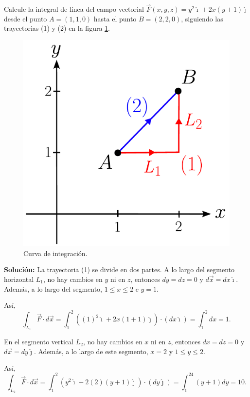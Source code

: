 \begin{ejemplo}
    Calcule la integral de línea del campo vectorial $\Vec{F}(x,y,z) = y^2 \hat{\imath} + 2x(y+1) \hat{\jmath}$ desde el punto $A = (1,1,0)$ hasta el punto $B = (2,2,0)$, siguiendo las trayectorias (1) y (2) en la figura \ref{fig:Ej_Int_Linea}.

    \begin{figure}[H]
        \centering
        \includegraphics[scale = 0.55]{Figuras/Ej-Integral-Linea.pdf}
        \caption{Curva de integración.}
        \label{fig:Ej_Int_Linea}
    \end{figure}

    \textbf{Solución:} La trayectoria (1) se divide en dos partes. A lo largo del segmento horizontal $L_1$, no hay cambios en $y$ ni en $z$, entonces $dy = dz = 0$ y $d\Vec{x} = dx \hat{\imath}$. Además, a lo largo del segmento, $1 \leq x \leq 2$ e $y = 1$.

    Así,
    $$\int_{L_1} \Vec{F} \cdot d \Vec{x} = \int_1^2 ((1)^2 \hat{\imath} + 2x(1+1) \hat{\jmath}) \cdot (dx \hat{\imath}) = \int_1^2 dx = 1.$$

    En el segmento vertical $L_2$, no hay cambios en $x$ ni en $z$, entonces $dx = dz = 0$ y $d\Vec{x} = dy \hat{\jmath}$. Además, a lo largo de este segmento, $x = 2$ y $1 \leq y \leq 2$.

    Así,
    $$\int_{L_2} \Vec{F} \cdot d \Vec{x} = \int_1^2 (y^2 \hat{\imath} + 2(2)(y+1) \hat{\jmath}) \cdot (dy \hat{\jmath}) = \int_1^24(y+1) dy = 10.$$


\end{ejemplo}
